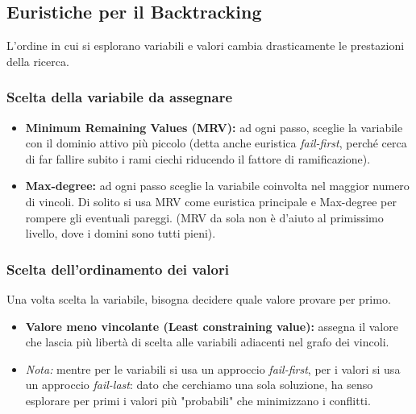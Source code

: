 \documentclass[a4paper,11pt]{report}
\begin{document}
\subsection{Euristiche per il Backtracking}
L'ordine in cui si esplorano variabili e valori cambia drasticamente le prestazioni della ricerca.

\subsubsection{Scelta della variabile da assegnare}
\begin{itemize}
    \item \textbf{Minimum Remaining Values (MRV):} ad ogni passo, sceglie la variabile con il dominio attivo più piccolo (detta anche euristica \textit{fail-first}, perché cerca di far fallire subito i rami ciechi riducendo il fattore di ramificazione).
    \item \textbf{Max-degree:} ad ogni passo sceglie la variabile coinvolta nel maggior numero di vincoli. Di solito si usa MRV come euristica principale e Max-degree per rompere gli eventuali pareggi. (MRV da sola non è d'aiuto al primissimo livello, dove i domini sono tutti pieni).
\end{itemize}

\subsubsection{Scelta dell'ordinamento dei valori}
Una volta scelta la variabile, bisogna decidere quale valore provare per primo.
\begin{itemize}
    \item \textbf{Valore meno vincolante (Least constraining value):} assegna il valore che lascia più libertà di scelta alle variabili adiacenti nel grafo dei vincoli. 
    \item \textit{Nota:} mentre per le variabili si usa un approccio \textit{fail-first}, per i valori si usa un approccio \textit{fail-last}: dato che cerchiamo una sola soluzione, ha senso esplorare per primi i valori più "probabili" che minimizzano i conflitti.
\end{itemize}
\end{document}
